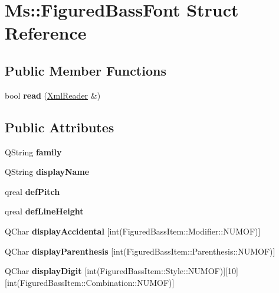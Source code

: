 \hypertarget{struct_ms_1_1_figured_bass_font}{}\section{Ms\+:\+:Figured\+Bass\+Font Struct Reference}
\label{struct_ms_1_1_figured_bass_font}
\subsection*{Public Member Functions}
\begin{DoxyCompactItemize}
\item 
\mbox{\label{struct_ms_1_1_figured_bass_font_a4ffdaf75e3f74c9faf04d5073f27a7ed}} 
bool {\bfseries read} (\hyperlink{class_ms_1_1_xml_reader}{Xml\+Reader} \&)
\end{DoxyCompactItemize}
\subsection*{Public Attributes}
\begin{DoxyCompactItemize}
\item 
\mbox{\label{struct_ms_1_1_figured_bass_font_a5750fc6457b94e143e2c14fe488f83c1}} 
Q\+String {\bfseries family}
\item 
\mbox{\label{struct_ms_1_1_figured_bass_font_aec86abb0abf294b4834b29b91c893379}} 
Q\+String {\bfseries display\+Name}
\item 
\mbox{\label{struct_ms_1_1_figured_bass_font_a92c216df7f066d18cae9d8d0e62ff11a}} 
qreal {\bfseries def\+Pitch}
\item 
\mbox{\label{struct_ms_1_1_figured_bass_font_a14e99218f47aa1c53e218a25580308d1}} 
qreal {\bfseries def\+Line\+Height}
\item 
\mbox{\label{struct_ms_1_1_figured_bass_font_a8549a6c390b7b3fe145f40dc37c81b41}} 
Q\+Char {\bfseries display\+Accidental} \mbox{[}int(Figured\+Bass\+Item\+::\+Modifier\+::\+N\+U\+M\+OF)\mbox{]}
\item 
\mbox{\label{struct_ms_1_1_figured_bass_font_a7067ec856629164beefa3e51bd609d6f}} 
Q\+Char {\bfseries display\+Parenthesis} \mbox{[}int(Figured\+Bass\+Item\+::\+Parenthesis\+::\+N\+U\+M\+OF)\mbox{]}
\item 
\mbox{\label{struct_ms_1_1_figured_bass_font_af73ba6b2a8112c712967e5845a8599e0}} 
Q\+Char {\bfseries display\+Digit} \mbox{[}int(Figured\+Bass\+Item\+::\+Style\+::\+N\+U\+M\+OF)\mbox{]}\mbox{[}10\mbox{]}\mbox{[}int(Figured\+Bass\+Item\+::\+Combination\+::\+N\+U\+M\+OF)\mbox{]}
\end{DoxyCompactItemize}


